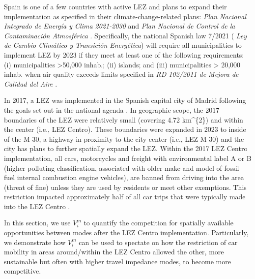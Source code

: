 \documentclass[]{trbunofficial}
\begin{document}
Spain is one of a few countries with active LEZ and plans to expand
their implementation as specified in their climate-change-related plans:
\emph{Plan Nacional Integrado de Energía y Clima 2021-2030}
\citep{espanaPlanNacionalIntegrado2020} and \emph{Plan Nacional de
Control de la Contaminación Atmosférica}
\citep{espanaResolucion10Enero2020}. Specifically, the national Spanish
law 7/2021 ( \emph{Ley de Cambio Climático y Transición Energética})
will require all municipalities to implement LEZ by 2023 if they meet at
least one of the following requirements: (i) municipalities
\textgreater50,000 inhab.; (ii) islands; and (iii) municipalities
\textgreater{} 20,000 inhab. when air quality exceeds limits specified
in \emph{RD 102/2011 de Mejora de Calidad del Aire}
\citep{barcelonaGUIATECNICAPARA2021}.

In 2017, a LEZ was implemented in the Spanish capital city of Madrid
following the goals set out in the national agenda . In geographic
scope, the 2017 boundaries of the LEZ were relatively small (covering
4.72 km\^{}\{2\}) and within the center (i.e., LEZ Centro). These
boundaries were expanded in 2023 to inside of the M-30, a highway in
proximity to the city center (i.e., LEZ M-30) and the city has plans to
further spatially expand the LEZ. Within the 2017 LEZ Centro
implementation, all cars, motorcycles and freight with environmental
label A or B (higher polluting classification, associated with older
make and model of fossil fuel internal combustion engine vehicles), are
banned from driving into the area (threat of fine) unless they are used
by residents or meet other exemptions. This restriction impacted
approximately half of all car trips that were typically made into the
LEZ Centro \citep{tarrinoortizAnalyzingImpactLow2022}.

In this section, we use \(V_i^m\) to quantify the competition for
spatially available opportunities between modes after the LEZ Centro
implementation. Particularly, we demonstrate how \(V_i^m\) can be used
to spectate on how the restriction of car mobility in areas
around/within the LEZ Centro allowed the other, more sustainable but
often with higher travel impedance modes, to become more competitive.
\end{document}
